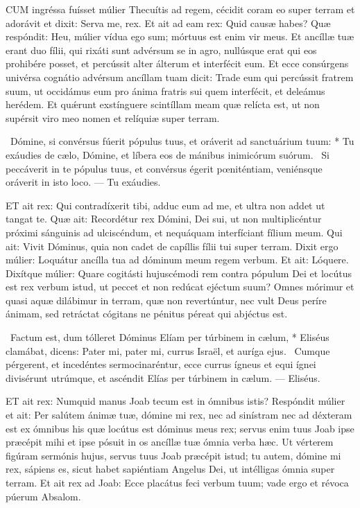 
\lettrine[lines=2]{C}{UM} ingréssa fuísset múlier Thecuítis ad regem, cécidit coram eo super terram et adorávit et dixit: Serva me, rex. Et ait ad eam rex: Quid causæ habes? Quæ respóndit: Heu, múlier vídua ego sum; mórtuus est enim vir meus. Et ancíllæ tuæ erant duo fílii, qui rixáti sunt advérsum se in agro, nullúsque erat qui eos prohibére posset, et percússit alter álterum et interfécit eum. Et ecce consúrgens univérsa cognátio advérsum ancíllam tuam dicit: Trade eum qui percússit fratrem suum, ut occidámus eum pro ánima fratris sui quem interfécit, et deleámus herédem. Et quǽrunt exstínguere scintíllam meam quæ relícta est, ut non supérsit viro meo nomen et relíquiæ super terram.

\R\ Dómine, si convérsus fúerit pópulus tuus, et oráverit ad sanctuárium tuum: * Tu exáudies de cælo, Dómine, et líbera eos de mánibus inimicórum suórum. \V\ Si peccáverit in te pópulus tuus, et convérsus égerit pœniténtiam, veniénsque oráverit in isto loco. --- Tu exáudies.


\lettrine[lines=2]{E}{T} ait rex: Qui contradíxerit tibi, adduc eum ad me, et ultra non addet ut tangat te. Quæ ait: Recordétur rex Dómini, Dei sui, ut non multiplicéntur próximi sánguinis ad ulciscéndum, et nequáquam interfíciant fílium meum. Qui ait: Vivit Dóminus, quia non cadet de capíllis fílii tui super terram. Dixit ergo múlier: Loquátur ancílla tua ad dóminum meum regem verbum. Et ait: Lóquere. Dixítque múlier: Quare cogitásti hujuscémodi rem contra pópulum Dei et locútus est rex verbum istud, ut peccet et non redúcat ejéctum suum? Omnes mórimur et quasi aquæ dilábimur in terram, quæ non revertúntur, nec vult Deus períre ánimam, sed retráctat cógitans ne pénitus péreat qui abjéctus est.

\R\ Factum est, dum tólleret Dóminus Elíam per túrbinem in cælum, * Eliséus clamábat, dicens: Pater mi, pater mi, currus Israël, et auríga ejus. \V\ Cumque pérgerent, et incedéntes sermocinaréntur, ecce currus ígneus et equi ígnei divisérunt utrúmque, et ascéndit Elías per túrbinem in cælum. --- Eliséus.



\lettrine[lines=2]{E}{T} ait rex: Numquid manus Joab tecum est in ómnibus istis? Respóndit múlier et ait: Per salútem ánimæ tuæ, dómine mi rex, nec ad sinístram nec ad déxteram est ex ómnibus his quæ locútus est dóminus meus rex; servus enim tuus Joab ipse præcépit mihi et ipse pósuit in os ancíllæ tuæ ómnia verba hæc. Ut vérterem figúram sermónis hujus, servus tuus Joab præcépit istud; tu autem, dómine mi rex, sápiens es, sicut habet sapiéntiam Angelus Dei, ut intélligas ómnia super terram. Et ait rex ad Joab: Ecce placátus feci verbum tuum; vade ergo et révoca púerum Absalom.

